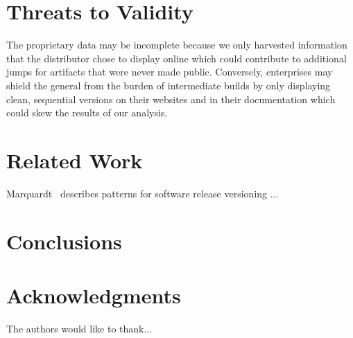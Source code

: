 \documentclass[conference]{IEEEtran}
\begin{document}
\section{Threats to Validity}

 The proprietary data may be incomplete because we only harvested information that the distributor chose to display online which could contribute to additional jumps for artifacts that were never made public. Conversely, enterprises may shield the general from the burden of intermediate builds by only displaying clean, sequential versions on their websites and in their documentation which could skew the results of our analysis.



\section{Related Work}

Marquardt~\cite{Marquardt2010:EuroPLoP} describes patterns for software release versioning ...


\section{Conclusions}


\section*{Acknowledgments}

The authors would like to thank...

%

\end{document}
